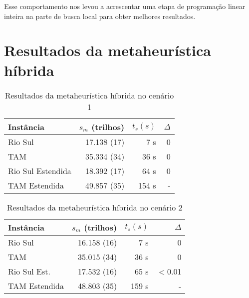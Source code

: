 Esse comportamento nos levou a acrescentar uma etapa de programação linear
inteira na parte de busca local para obter melhores resultados.


\section{Resultados da metaheurística híbrida} \label{result:hibrid}

\begin{table}[ht]
\caption{Resultados da metaheurística híbrida no cenário
1}\label{tab:hibrydcenario1}

\begin{center}
\begin{tabular}{l |r r r}
\hline

Instância 		& $s_{m}$ (trilhos) & $t_{s}(s)$ & $\Delta$
\\
\hline

Rio Sul 			& 17.138 (17) 	& 7 s 		 & 0\\
TAM     			& 35.334 (34)	& 36 s 		 & 0\\
Rio Sul Estendida 	& 18.392 (17)	& 64 s 		 & 0\\
TAM Estendida 		& 49.857 (35)	& 154 s		 & -\\

\hline
\end{tabular}
\end{center}
\end{table}


\begin{table}[ht]
\caption{Resultados da metaheurística híbrida no cenário
2}\label{tab:hybridcenario2}

\begin{center}
\begin{tabular}{l |r r r}
\hline

Instância 			& $s_{m}$ (trilhos) & $t_{s}(s)$ & $\Delta$
\\
\hline

Rio Sul 			& 16.158 (16) 	& 7 s 		 & 0\\
TAM     			& 35.015 (34)	& 36 s 		 & 0\\
Rio Sul Est. 		& 17.532 (16)	& 65 s 		 &$<$0.01\\ 
TAM Estendida 		& 48.803 (35)	& 159 s		 & -\\

\hline
\end{tabular}
\end{center}

\end{table}


